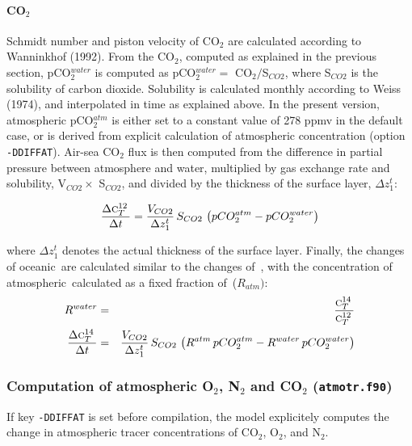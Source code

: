 \documentclass[11pt,a4paper,fleqn,twoside]{article}
\def\car{\text{\textsc{c$_T^{12}$}}\,}
\def\cariso{\text{\textsc{c$_T^{14}$}}\,}
\begin{document}
\paragraph{CO$_2$} Schmidt number and piston velocity of CO$_2$ are calculated
according to Wanninkhof (1992)\nocite{wanninkhof:1992}. From the CO$_2$, computed
as explained in the previous section, pCO$_2^{water}$ is computed as
pCO$_2^{water} =$ CO$_2 / $S$_{CO2}$, where S$_{CO2}$ is the solubility of
carbon dioxide. Solubility is calculated monthly according to Weiss
(1974)\nocite{weiss:1974},  and interpolated in time as explained
above.  In the present version, atmospheric pCO$_2^{atm}$ is either set to a 
constant value of 278 ppmv in the default case, or is derived from explicit calculation of
atmospheric concentration (option {\tt -DDIFFAT}).  Air-sea CO$_2$ flux is then
computed from the difference in partial pressure between atmosphere and water,
multiplied by gas exchange rate and solubility, V$_{CO2} \times$ S$_{CO2}$, and
divided by the thickness of the surface layer, $\Delta z^t_1$:

\begin{equation}
\frac{\Delta  \car}{\Delta  t} = \frac{V_{CO2}}{\Delta z^t_1}\,
S_{CO2}\,\left(pCO_2^{atm}-pCO_2^{water}\right)
\end{equation}
 
where $\Delta z_1^t$ denotes the actual thickness of the surface layer.  Finally,
the changes of oceanic \cariso are calculated similar to the changes of \car,
with the concentration of atmospheric \cariso calculated as a fixed fraction of
\car ($R_{atm})$: 
\begin{eqnarray}
R^{water} & = & \frac{\cariso}{\car} \nonumber \\
\frac{\Delta  \cariso}{\Delta  t} & = & \frac{V_{CO2}}{\Delta z^t_1}\,
S_{CO2}\,\left(R^{atm}\, pCO_2^{atm}-R^{water}\,pCO_2^{water}\right)
\end{eqnarray}
 

\subsubsection{\label{atmospheric_tracers}Computation of atmospheric 
O$_2$, N$_2$ and CO$_2$ ({\tt atmotr.f90})}

If key {\tt -DDIFFAT} is set before compilation, the model explicitely computes
the change in atmospheric tracer concentrations of CO$_2$, O$_2$, and N$_2$.
\end{document}
